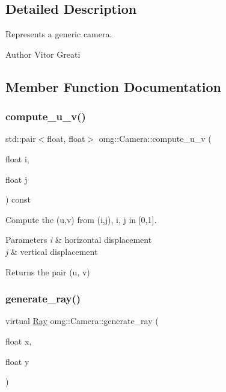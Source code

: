 \subsection{Detailed Description}
Represents a generic camera. 

\begin{DoxyAuthor}{Author}
Vitor Greati 
\end{DoxyAuthor}


\subsection{Member Function Documentation}
\mbox{\label{classomg_1_1_camera_a7978815c7f03689ea47eaf70065b4266}} 
\subsubsection{\texorpdfstring{compute\_u\_v()}{compute\_u\_v()}}
{\footnotesize\ttfamily std\+::pair$<$float, float$>$ omg\+::\+Camera\+::compute\+\_\+u\+\_\+v (\begin{DoxyParamCaption}\item[{float}]{i,  }\item[{float}]{j }\end{DoxyParamCaption}) const\hspace{0.3cm}{\ttfamily [inline]}}



Compute the (u,v) from (i,j), i, j in \mbox{[}0,1\mbox{]}. 


\begin{DoxyParams}{Parameters}
{\em i} & horizontal displacement \\
\hline
{\em j} & vertical displacement \\
\hline
\end{DoxyParams}
\begin{DoxyReturn}{Returns}
the pair (u, v) 
\end{DoxyReturn}
\mbox{\label{classomg_1_1_camera_aca08c044082cb3573d606a8c851f52fe}} 
\subsubsection{\texorpdfstring{generate\_ray()}{generate\_ray()}}
{\footnotesize\ttfamily virtual \mbox{\hyperlink{classomg_1_1_ray}{Ray}} omg\+::\+Camera\+::generate\+\_\+ray (\begin{DoxyParamCaption}\item[{float}]{x,  }\item[{float}]{y }\end{DoxyParamCaption})\hspace{0.3cm}{\ttfamily [pure virtual]}}



